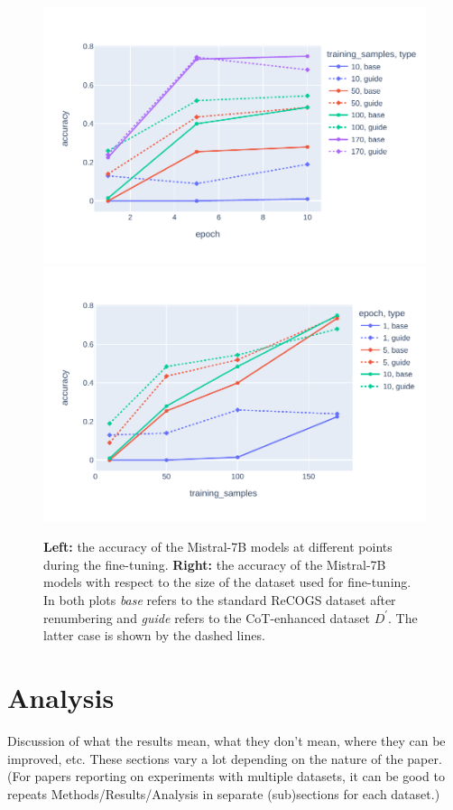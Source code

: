 \documentclass[11pt]{article}
\begin{document}
    \begin{figure}
        \centering
        \includegraphics[width=0.45\linewidth]{../plots/accuracy_vs_epoch.pdf}
        \includegraphics[width=0.45\linewidth]{../plots/accuracy_vs_data.pdf}
        \caption{
            \textbf{Left:} the accuracy of the Mistral-7B models at different points during the fine-tuning.
            \textbf{Right:} the accuracy of the Mistral-7B models with respect to the size of the dataset used for fine-tuning.\\
            In both plots \emph{base} refers to the standard ReCOGS dataset after renumbering and \emph{guide}
            refers to the CoT-enhanced dataset $D^\prime$. The latter case is shown by the dashed lines.
        }
        \label{fig:acc_vs_data_and_epoch}
    \end{figure}


    \section{Analysis}

    Discussion of what the results mean, what they don’t mean, where they can be improved, etc. These sections vary a lot depending on the nature of the paper. (For papers reporting on experiments with multiple datasets, it can be good to repeats Methods/Results/Analysis in separate (sub)sections for each dataset.)
\end{document}
